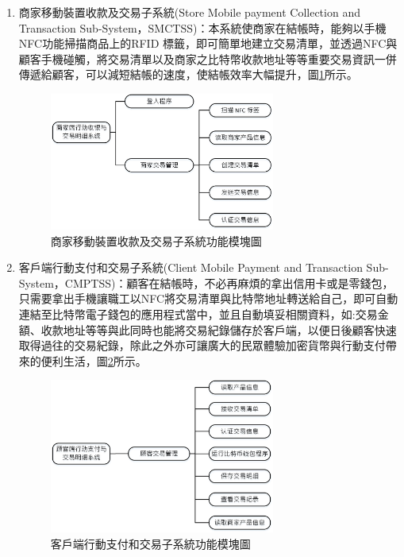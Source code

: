 \begin{enumerate}
		\item 商家移動裝置收款及交易子系統(Store Mobile payment Collection and Transaction Sub-System，SMCTSS)：本系統使商家在結帳時，能夠以手機NFC功能掃描商品上的RFID 標籤，即可簡單地建立交易清單，並透過NFC與顧客手機碰觸，將交易清單以及商家之比特幣收款地址等等重要交易資訊一併傳遞給顧客，可以減短結帳的速度，使結帳效率大幅提升，圖\ref{model3}所示。
		 
			\begin{figure}[!htbp]
			\centering
			\includegraphics[width = 0.7\textwidth]{model3.jpg}
			\caption{商家移動裝置收款及交易子系統功能模塊圖}\label{model3}
			\end{figure}


		\item 客戶端行動支付和交易子系統(Client Mobile Payment and Transaction Sub-System，CMPTSS)：顧客在結帳時，不必再麻煩的拿出信用卡或是零錢包，只需要拿出手機讓職工以NFC將交易清單與比特幣地址轉送給自己，即可自動連結至比特幣電子錢包的應用程式當中，並且自動填妥相關資料，如:交易金額、收款地址等等與此同時也能將交易紀錄儲存於客戶端，以便日後顧客快速取得過往的交易紀錄，除此之外亦可讓廣大的民眾體驗加密貨幣與行動支付帶來的便利生活，圖\ref{model2}所示。
			\begin{figure}[!htbp]
			\centering
			\includegraphics[width = 0.7\textwidth]{model2.jpg}
			\caption{客戶端行動支付和交易子系統功能模塊圖}\label{model2}
			\end{figure}
		
	\end{enumerate}
	

